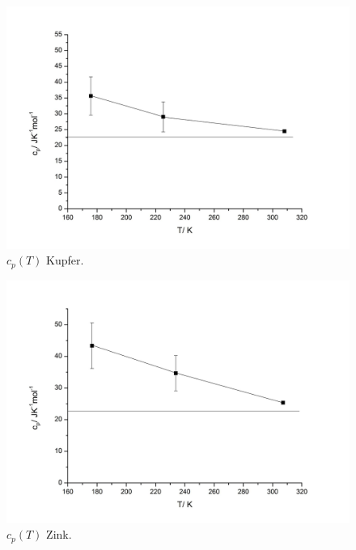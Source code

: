 \documentclass[12pt,a4paper,titlepage,headinclude,bibtotoc]{scrartcl}
\begin{document}
\begin{figure} [h!]
\centering
\includegraphics[width=13.5cm]{Kupfer_ja.jpeg} 
\caption{$c_p(T)$ Kupfer.}
\end{figure} 
\FloatBarrier  

\begin{figure} [h!]
\centering
\includegraphics[width=13.5cm]{Zink_ja.jpeg} 
\caption{$c_p(T)$ Zink.}
\end{figure}    
\FloatBarrier 

\end{document}
